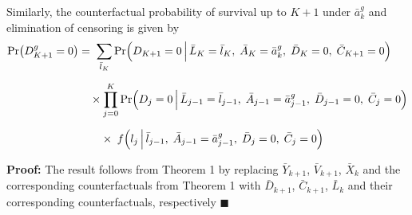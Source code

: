 \begin{tcolorbox}[title=Corollary 3: g-formula for competing event]
    Similarly, the counterfactual probability of survival up to $K+1$ under $\bar{a}^g_k$ and elimination of censoring is given by
    \begin{align*}
      \Pr\bigl(D_{K+1}^{g} = 0\bigr)
      &=\;
      \sum_{\bar{l}_K} \Pr\Bigl(D_{K+1} = 0 \,\Big|\,\bar{L}_K = \bar{l}_K,\;\bar{A}_K=\bar{a}^g_k,\; \bar{D}_K=0,\;\bar{C}_{K+1}=0 \Bigr) \\[6pt]
      &\quad \times
      \prod_{j=0}^{K} \Pr\Bigl(D_j=0 \,\Big|\, \bar{L}_{j-1} = \bar{l}_{j-1},\;\bar{A}_{j-1} = \bar{a}^g_{j-1},\; \bar{D}_{j-1} = 0,\;\bar{C}_j = 0 \Bigr) \\[6pt]
      &\quad\quad \times\;
        f\Bigl(l_j \,\Big|\,\bar{l}_{j-1},\;\bar{A}_{j-1} = \bar{a}^g_{j-1},\; \bar{D}_{j} = 0,\;\bar{C}_j = 0 \Bigr)
    \end{align*}

\end{tcolorbox}

\textbf{Proof:} The result follows from Theorem 1 by replacing $\bar{Y}_{k+1}$, $\bar{V}_{k+1}$, $\bar{X}_k$ and the corresponding counterfactuals from Theorem 1 with $\bar{D}_{k+1}$, $\bar{C}_{k+1}$, $\bar{L}_k$ and their corresponding counterfactuals, respectively $\blacksquare$